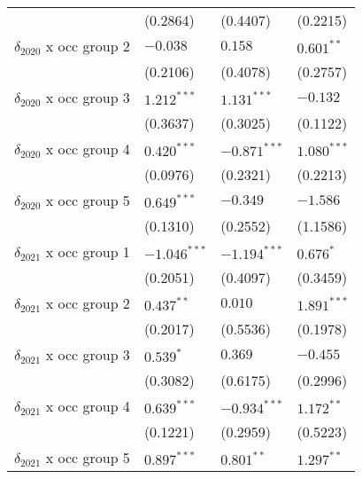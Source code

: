 \begin{tabular}{llll}
                                       &           (0.2864) &           (0.4407) &           (0.2215) \\
$\delta_{2020}$ x occ group 2          &           $-0.038$ &            $0.158$ &       $0.601^{**}$ \\
                                       &           (0.2106) &           (0.4078) &           (0.2757) \\
$\delta_{2020}$ x occ group 3          &      $1.212^{***}$ &      $1.131^{***}$ &           $-0.132$ \\
                                       &           (0.3637) &           (0.3025) &           (0.1122) \\
$\delta_{2020}$ x occ group 4          &      $0.420^{***}$ &     $-0.871^{***}$ &      $1.080^{***}$ \\
                                       &           (0.0976) &           (0.2321) &           (0.2213) \\
$\delta_{2020}$ x occ group 5          &      $0.649^{***}$ &           $-0.349$ &           $-1.586$ \\
                                       &           (0.1310) &           (0.2552) &           (1.1586) \\
$\delta_{2021}$ x occ group 1          &     $-1.046^{***}$ &     $-1.194^{***}$ &          $0.676^*$ \\
                                       &           (0.2051) &           (0.4097) &           (0.3459) \\
$\delta_{2021}$ x occ group 2          &       $0.437^{**}$ &            $0.010$ &      $1.891^{***}$ \\
                                       &           (0.2017) &           (0.5536) &           (0.1978) \\
$\delta_{2021}$ x occ group 3          &          $0.539^*$ &            $0.369$ &           $-0.455$ \\
                                       &           (0.3082) &           (0.6175) &           (0.2996) \\
$\delta_{2021}$ x occ group 4          &      $0.639^{***}$ &     $-0.934^{***}$ &       $1.172^{**}$ \\
                                       &           (0.1221) &           (0.2959) &           (0.5223) \\
$\delta_{2021}$ x occ group 5          &      $0.897^{***}$ &       $0.801^{**}$ &       $1.297^{**}$ \\

\end{tabular}
